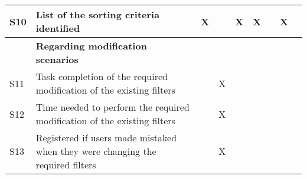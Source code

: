 \begin{longtable}{@{}lm{7cm}ccccccc@{}}
    S10          & List of the sorting criteria identified                                                                                                                 & X                                              &                                                & X                                              & X                                              &                                                & X                                              &                                                \\* \midrule
                & \textbf{Regarding modification scenarios}                                                                                                               &                                                &                                                &                                                &                                                &                                                &                                                &                                                \\* \midrule
    S11         & Task completion of the required modification of the existing filters                                                                                    &                                                & X                                              &                                                &                                                &                                                &                                                &                                                \\
    S12         & Time needed to perform the required modification of the existing filters                                                                                &                                                & X                                              &                                                &                                                &                                                &                                                &                                                \\
    S13         & Registered if users made mistaked when they were changing the required filters                                                                          &                                                & X                                              &                                                &                                                &                                                &                                                &                                                \\

\end{longtable}
